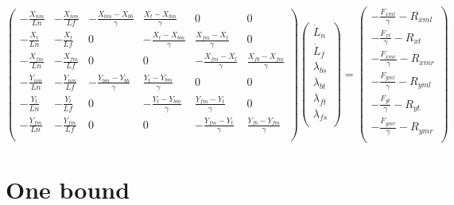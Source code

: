\documentclass[11pt,twocolumn]{article}
\begin{document}
\[
\begin{pmatrix}
  -\frac{X_{nm}}{Ln} & -\frac{X_{nm}}{Lf}
  & -\frac{X_{bm}-X_{bb}}{\gamma} & \frac{X_{t}-X_{bm}}{\gamma} & 0 & 0\\
  -\frac{X_{t}}{Ln} & -\frac{X_{t}}{Lf}
  & 0 & -\frac{X_{t}-X_{bm}}{\gamma} & \frac{X_{fm}-X_{t}}{\gamma} & 0\\
  -\frac{X_{fm}}{Ln} & -\frac{X_{fm}}{Lf}
  & 0 & 0 & -\frac{X_{fm}-X_{t}}{\gamma} & \frac{X_{fb}-X_{fm}}{\gamma}\\
  -\frac{Y_{nm}}{Ln} & -\frac{Y_{nm}}{Lf}
  & -\frac{Y_{bm}-Y_{bb}}{\gamma} & \frac{Y_{t}-Y_{bm}}{\gamma} & 0 & 0\\
  -\frac{Y_{t}}{Ln} & -\frac{Y_{t}}{Lf}
  & 0 & -\frac{Y_{t}-Y_{bm}}{\gamma} & \frac{Y_{fm}-Y_{t}}{\gamma} & 0\\
  -\frac{Y_{fm}}{Ln} & -\frac{Y_{fm}}{Lf}
  & 0 & 0 & -\frac{Y_{fm}-Y_{t}}{\gamma} & \frac{Y_{fb}-Y_{fm}}{\gamma}\\
\end{pmatrix}
\begin{pmatrix}
  \dot{L}_n\\
  \dot{L}_f\\
  \lambda_{bs}\\
  \lambda_{bt}\\
  \lambda_{ft}\\
  \lambda_{fs}\\
\end{pmatrix}
=
\begin{pmatrix}
  -\frac{F_{xml}}{\gamma} - R_{xml}\\
  -\frac{F_{xt}}{\gamma} - R_{xt}\\
  -\frac{F_{xmr}}{\gamma} - R_{xmr}\\
  -\frac{F_{yml}}{\gamma} - R_{yml}\\
  -\frac{F_{yt}}{\gamma} - R_{yt}\\
  -\frac{F_{ymr}}{\gamma} - R_{ymr}\\
\end{pmatrix}
\]

\twocolumn

\section{One bound}
\end{document}
